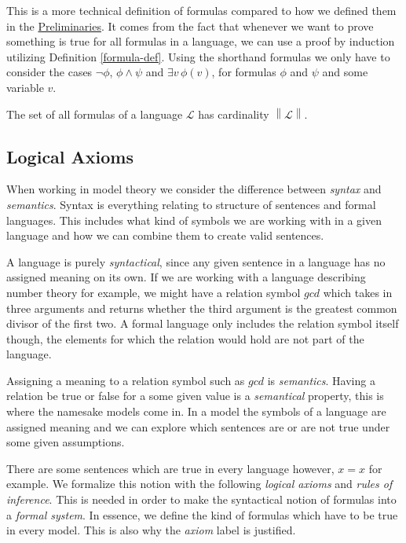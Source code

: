 \documentclass[../../main.tex]{subfiles}
\begin{document}
This is a more technical definition of formulas compared to how we defined them in the \hyperref[preliminaries]{Preliminaries}.
It comes from the fact that whenever we want to prove something is true for all formulas in a language, 
we can use a proof by induction utilizing Definition \ref{formula-def}.
Using the shorthand formulas we only have to consider the cases $\lnot \phi$, $\phi \wedge \psi$ and $\exists v\, \phi(v)$,
for formulas $\phi$ and $\psi$ and some variable $v$.

\begin{proposition}\label{language-cardinality}\cite[Proposition 1.3.4.]{Cha90}
    The set of all formulas of a language $\mathcal{L}$ has cardinality $\left\lVert\mathcal{L}\right\rVert$.
\end{proposition}

\subsection{Logical Axioms}

When working in model theory we consider the difference between \textit{syntax} and \textit{semantics}.
Syntax is everything relating to structure of sentences and formal languages.
This includes what kind of symbols we are working with in a given language and how we can combine them to create valid sentences.

A language is purely \textit{syntactical}, since any given sentence in a language has no assigned meaning on its own.
If we are working with a language describing number theory for example, 
we might have a relation symbol $gcd$ which takes in three arguments and returns whether the third argument is the greatest common divisor of the first two.
A formal language only includes the relation symbol itself though, the elements for which the relation would hold are not part of the language.

Assigning a meaning to a relation symbol such as $gcd$ is \textit{semantics}.
Having a relation be true or false for a some given value is a \textit{semantical} property, this is where the namesake models come in.
In a model the symbols of a language are assigned meaning and we can explore which sentences are or are not true under some given assumptions.\cite[p.3]{Cha90}

There are some sentences which are true in every language however, $x = x$ for example.
We formalize this notion with the following \textit{logical axioms} and \textit{rules of inference}.
This is needed in order to make the syntactical notion of formulas into a \textit{formal system}.
In essence, we define the kind of formulas which have to be true in every model.
This is also why the \textit{axiom} label is justified.
\end{document}
